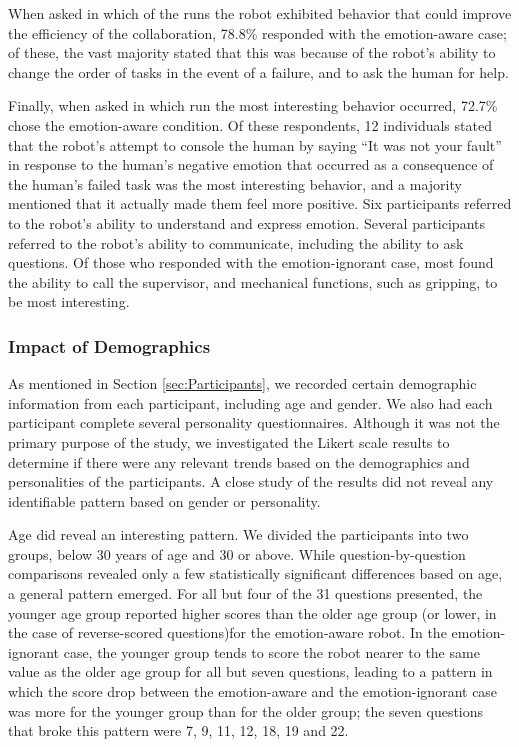 \documentclass[12pt]{report}
\begin{document}
When asked in which of the runs the robot exhibited behavior that could improve
the efficiency of the collaboration, 78.8\% responded with the emotion-aware
case; of these, the vast majority stated that this was because of the robot's
ability to change the order of tasks in the event of a failure, and to ask the
human for help.

Finally, when asked in which run the most interesting behavior occurred,
72.7\% chose the emotion-aware condition. Of these respondents, 12
individuals stated that the robot's attempt to console the human by saying ``It
was not your fault'' in response to the human's negative emotion that occurred
as a consequence of the human's failed task was the most interesting behavior,
and a majority mentioned that it actually made them feel more positive. Six
participants referred to the robot's ability to understand and express emotion.
Several participants referred to the robot's ability to communicate, including
the ability to ask questions. Of those who responded with the emotion-ignorant
case, most found the ability to call the supervisor, and mechanical functions,
such as gripping, to be most interesting.

\subsubsection{Impact of Demographics} 
As mentioned in Section \ref{sec:Participants}, we recorded certain demographic
information from each participant, including age and gender. We also had each
participant complete several personality questionnaires. Although it was not the
primary purpose of the study, we investigated the Likert scale results to
determine if there were any relevant trends based on the demographics and
personalities of the participants. A close study of the results did  not reveal
any identifiable pattern based on gender or personality.

Age did reveal an interesting pattern. We divided the participants into two
groups, below 30 years of age and 30 or above. While question-by-question
comparisons revealed only a few statistically significant differences based on
age, a general pattern emerged. For all but four of the 31 questions presented,
the younger age group reported higher scores than the older age group (or lower,
in the case of reverse-scored questions)for the emotion-aware robot. In the
emotion-ignorant case, the younger group tends to score the robot nearer to
the same value as the older age group for all but seven questions, leading to a
pattern in which the score drop between the emotion-aware and the
emotion-ignorant case was more for the younger group than for the older group;
the seven questions that broke this pattern were 7, 9, 11, 12, 18, 19 and 22.
\end{document}
